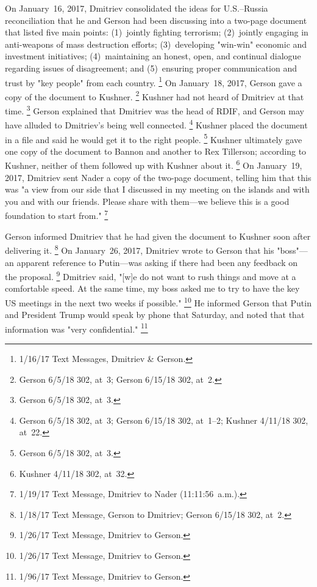 On January~16, 2017, Dmitriev consolidated the ideas for U.S.--Russia reconciliation that he and Gerson had been discussing into a two-page document that listed five main points:
(1)~jointly fighting terrorism;
(2)~jointly engaging in anti-weapons of mass destruction efforts;
(3)~developing "win-win" economic and investment initiatives;
(4)~maintaining an honest, open, and continual dialogue regarding issues of disagreement; and
(5)~ensuring proper communication and trust by "key people" from each country.%
\footnote{1/16/17 Text Messages, Dmitriev \& Gerson.}
On January~18, 2017, Gerson gave a copy of the document to Kushner.%
\footnote{Gerson 6/5/18 302, at~3;
Gerson 6/15/18 302, at~2.}
Kushner had not heard of Dmitriev at that time.%
\footnote{Gerson 6/5/18 302, at~3.}
Gerson explained that Dmitriev was the head of RDIF, and Gerson may have alluded to Dmitriev's being well connected.%
\footnote{Gerson 6/5/18 302, at~3;
Gerson 6/15/18 302, at~1--2;
Kushner 4/11/18 302, at~22.}
Kushner placed the document in a file and said he would get it to the right people.%
\footnote{Gerson 6/5/18 302, at~3.}
Kushner ultimately gave one copy of the document to Bannon and another to Rex Tillerson; according to Kushner, neither of them followed up with Kushner about it.%
\footnote{Kushner 4/11/18 302, at~32.}
On January~19, 2017, Dmitriev sent Nader a copy of the two-page document, telling him that this was "a view from our side that I discussed in my meeting on the islands and with you and with our friends.
Please share with them---we believe this is a good foundation to start from."%
\footnote{1/19/17 Text Message, Dmitriev to Nader (11:11:56~a.m.).}

Gerson informed Dmitriev that he had given the document to Kushner soon after delivering it.%
\footnote{1/18/17 Text Message, Gerson to Dmitriev;
Gerson 6/15/18 302, at~2.}
On January~26, 2017, Dmitriev wrote to Gerson that his "boss"---an apparent reference to Putin---was asking if there had been any feedback on the proposal.%
\footnote{1/26/17 Text Message, Dmitriev to Gerson.}
Dmitriev said, "[w]e do not want to rush things and move at a comfortable speed.
At the same time, my boss asked me to try to have the key US meetings in the next two weeks if possible."%
\footnote{1/26/17 Text Message, Dmitriev to Gerson.}
He informed Gerson that Putin and President Trump would speak by phone that Saturday, and noted that that information was "very confidential."%
\footnote{1/96/17 Text Message, Dmitriev to Gerson.}


